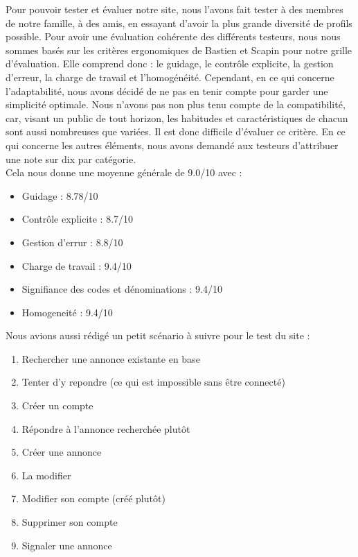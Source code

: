 \documentclass[a4paper,11pt]{article}
\begin{document}
Pour pouvoir tester et évaluer notre site, nous l'avons fait tester à des membres de notre famille, à des amis, en essayant d'avoir la plus grande diversité de profils possible.
Pour avoir une évaluation cohérente des différents testeurs, nous nous sommes basés sur les critères ergonomiques de Bastien et Scapin pour notre grille d'évaluation.
Elle comprend donc : le guidage, le contrôle explicite, la gestion d'erreur, la charge de travail et l'homogénéité.
Cependant, en ce qui concerne l'adaptabilité, nous avons décidé de ne pas en tenir compte pour garder une simplicité optimale. Nous n'avons pas non plus tenu compte de la compatibilité,
 car, visant un public de tout horizon, les habitudes et caractéristiques de chacun sont aussi nombreuses que variées. Il est donc difficile d'évaluer ce critère. En ce qui concerne les autres éléments,
 nous avons demandé aux testeurs d'attribuer une note sur dix par catégorie.\\

Cela nous donne une moyenne générale de 9.0/10 avec :\\
\begin{itemize}
  \item Guidage : 8.78/10
  \item Contrôle explicite : 8.7/10
  \item Gestion d'errur : 8.8/10
  \item Charge de travail : 9.4/10
  \item Signifiance des codes et dénominations : 9.4/10
  \item Homogeneité : 9.4/10
\end{itemize}

Nous avions aussi rédigé un petit scénario à suivre pour le test du site :
\begin{enumerate}
  \item Rechercher une annonce existante en base
  \item Tenter d'y repondre (ce qui est impossible sans être connecté)
  \item Créer un compte
  \item Répondre à l'annonce recherchée plutôt
  \item Créer une annonce
  \item La modifier
  \item Modifier son compte (créé plutôt)
  \item Supprimer son compte
  \item Signaler une annonce
\end{enumerate}
\end{document}
